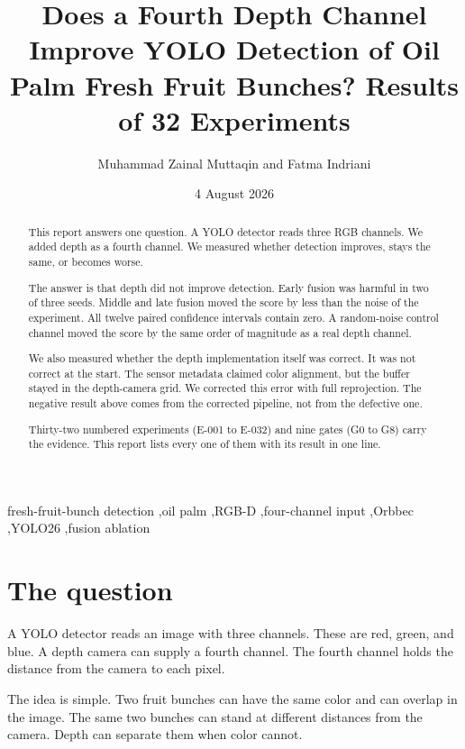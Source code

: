 \documentclass[preprint,12pt]{elsarticle}
\title{Does a Fourth Depth Channel Improve YOLO Detection of Oil Palm
Fresh Fruit Bunches? Results of 32 Experiments}
\author{Muhammad Zainal Muttaqin and Fatma Indriani}
\date{4 August 2026}
\newcommand{\E}[1]{E-#1}
\newcommand{\G}[1]{G#1}
\begin{document}
\begin{frontmatter}
\maketitle

\begin{abstract}
This report answers one question. A YOLO detector reads three RGB channels.
We added depth as a fourth channel. We measured whether detection improves,
stays the same, or becomes worse.

The answer is that depth did not improve detection. Early fusion was harmful
in two of three seeds. Middle and late fusion moved the score by less than
the noise of the experiment. All twelve paired confidence intervals contain
zero. A random-noise control channel moved the score by the same order of
magnitude as a real depth channel.

We also measured whether the depth implementation itself was correct. It was
not correct at the start. The sensor metadata claimed color alignment, but the
buffer stayed in the depth-camera grid. We corrected this error with full
reprojection. The negative result above comes from the corrected pipeline, not
from the defective one.

Thirty-two numbered experiments (\E{001} to \E{032}) and nine gates (\G{0} to
\G{8}) carry the evidence. This report lists every one of them with its result
in one line.
\end{abstract}

\begin{keyword}
fresh-fruit-bunch detection \sep oil palm \sep RGB-D \sep four-channel input
\sep Orbbec \sep YOLO26 \sep fusion ablation
\end{keyword}
\end{frontmatter}

\section{The question}
\label{sec:question}

A YOLO detector reads an image with three channels. These are red, green, and
blue. A depth camera can supply a fourth channel. The fourth channel holds the
distance from the camera to each pixel.

The idea is simple. Two fruit bunches can have the same color and can overlap
in the image. The same two bunches can stand at different distances from the
camera. Depth can separate them when color cannot.
\end{document}
